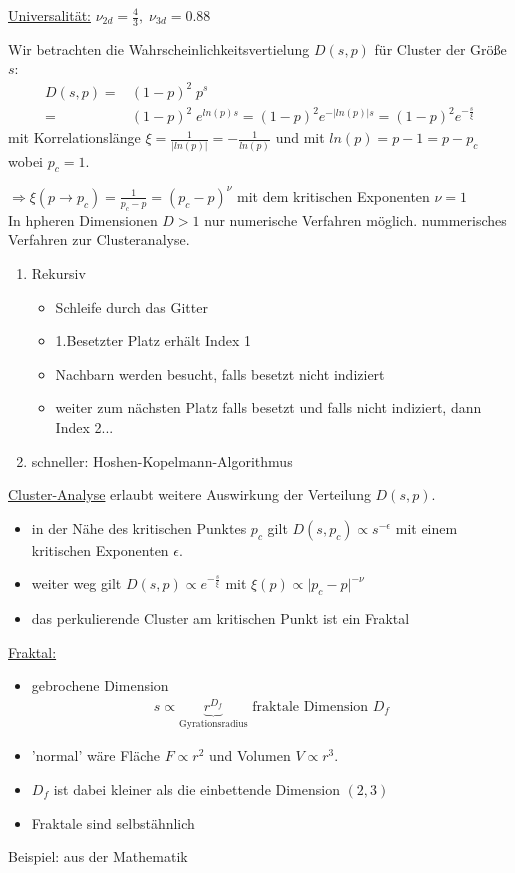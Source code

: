 \documentclass[12pt]{article}
\begin{document}
 	\underline{Universalität:} $\nu_{2d}= \frac{4}{3}, \; \nu_{3d}=0.88$
 	
 	 	Wir betrachten die Wahrscheinlichkeitsvertielung $D(s,p)$ für Cluster der Größe $s$: \begin{align}
 	D(s,p)=& (1-p)^2 \; p^s \\
 	=& (1-p)^2 \; e^{ln(p)s} = (1-p)^2 e^{- \vert ln(p) \vert s} = (1-p)^2 e^{-\frac{s}{\xi}}
 	\end{align}
 	mit Korrelationslänge $\xi = \frac{1}{\vert ln(p) \vert} = -\frac{1}{ln(p)}$ und mit $ln(p)= p-1= p-p_c$ wobei $p_c=1$. 
 	
 	$\Rightarrow \xi (p \to p_c) = \frac{1}{p_c-p}= (p_c - p)^\nu $ mit dem kritischen Exponenten $\nu =1$ \\
 	
 	In hpheren Dimensionen $D>1$ nur numerische Verfahren möglich. nummerisches Verfahren zur Clusteranalyse.
 		\begin{enumerate}
 		
 		\item Rekursiv %
 			\begin{itemize}
 			\item Schleife durch das Gitter
 			\item 1.Besetzter Platz erhält Index 1
 			\item Nachbarn werden besucht, falls besetzt nicht indiziert
 			\item weiter zum nächsten Platz falls besetzt und falls nicht indiziert, dann Index 2...
 			\end{itemize}
 			
 		\item schneller: Hoshen-Kopelmann-Algorithmus
 		
\end{enumerate} 	

\underline{Cluster-Analyse} erlaubt weitere Auswirkung der Verteilung $D(s,p)$.
\begin{itemize}
\item in der Nähe des kritischen Punktes $p_c$ gilt $D(s,p_c) \propto s^{-\epsilon}$ mit einem kritischen Exponenten $\epsilon$.
\item weiter weg gilt $D(s,p) \propto e^{-\frac{s}{\xi}}$ mit $\xi (p) \propto \vert p_c - p \vert ^{- \nu}$
\item das perkulierende Cluster am kritischen Punkt ist ein Fraktal
\end{itemize}	 
\underline{Fraktal:} \begin{itemize}
	\item gebrochene Dimension \begin{align}
	s \propto \underbrace{r^{D_f}}_\text{Gyrationsradius} \mbox{ fraktale Dimension } D_f
\end{align}	 
\item 'normal' wäre Fläche $F \propto r^2$ und Volumen $V \propto r^3$.
\item $D_f$ ist dabei kleiner als die einbettende Dimension $(2,3)$
\item Fraktale sind selbstähnlich
\end{itemize}
Beispiel: aus der Mathematik %
\end{document}
